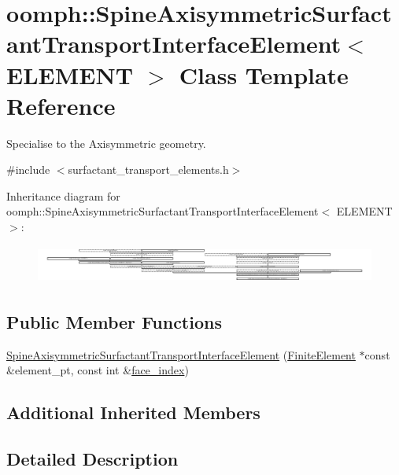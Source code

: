 \hypertarget{classoomph_1_1SpineAxisymmetricSurfactantTransportInterfaceElement}{}\section{oomph\+:\+:Spine\+Axisymmetric\+Surfactant\+Transport\+Interface\+Element$<$ E\+L\+E\+M\+E\+NT $>$ Class Template Reference}
\label{classoomph_1_1SpineAxisymmetricSurfactantTransportInterfaceElement}


Specialise to the Axisymmetric geometry.  




{\ttfamily \#include $<$surfactant\+\_\+transport\+\_\+elements.\+h$>$}

Inheritance diagram for oomph\+:\+:Spine\+Axisymmetric\+Surfactant\+Transport\+Interface\+Element$<$ E\+L\+E\+M\+E\+NT $>$\+:\begin{figure}[H]
\begin{center}
\leavevmode
\includegraphics[height=1.280000cm]{classoomph_1_1SpineAxisymmetricSurfactantTransportInterfaceElement}
\end{center}
\end{figure}
\subsection*{Public Member Functions}
\begin{DoxyCompactItemize}
\item 
\hyperlink{classoomph_1_1SpineAxisymmetricSurfactantTransportInterfaceElement_a60ac6b568dc388e584d423d4b4e9438a}{Spine\+Axisymmetric\+Surfactant\+Transport\+Interface\+Element} (\hyperlink{classoomph_1_1FiniteElement}{Finite\+Element} $\ast$const \&element\+\_\+pt, const int \&\hyperlink{classoomph_1_1FaceElement_a478d577ac6db67ecc80f1f02ae3ab170}{face\+\_\+index})
\end{DoxyCompactItemize}
\subsection*{Additional Inherited Members}


\subsection{Detailed Description}
